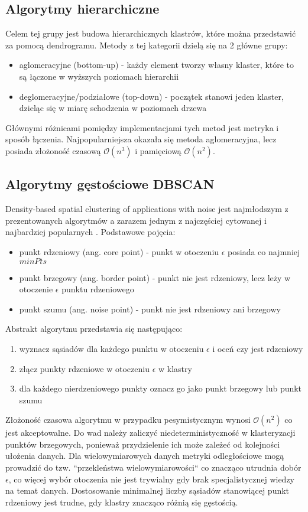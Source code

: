 \subsection{Algorytmy hierarchiczne}
Celem tej grupy jest budowa hierarchicznych klastrów, które można przedstawić za pomocą dendrogramu. Metody z tej kategorii dzielą się na 2 główne grupy:
\begin{itemize}
	\item aglomeracyjne (bottom-up) - każdy element tworzy własny klaster, które to są łączone w wyższych poziomach hierarchii
	\item deglomeracyjne/podziałowe (top-down) - początek stanowi jeden klaster, dzieląc się w miarę schodzenia w poziomach drzewa
\end{itemize}
Głównymi różnicami pomiędzy implementacjami tych metod jest metryka i sposób łączenia. Najpopularniejsza okazała się metoda aglomeracyjna, lecz posiada złożoność czasową $\mathcal{O}(n^3)$ i pamięciową $\mathcal{O}(n^2)$.

\subsection{Algorytmy gęstościowe DBSCAN}
Density-based spatial clustering of applications with noise jest najmłodszym z prezentowanych algorytmów a zarazem jednym z najczęściej cytowanej i najbardziej popularnych \cite{Est96}.
Podstawowe pojęcia:
\begin{itemize}
	\item punkt rdzeniowy (ang. core point) - punkt w otoczeniu $\epsilon$ posiada co najmniej $minPts$
	\item punkt brzegowy (ang. border point) - punkt nie jest rdzeniowy, lecz leży w otoczenie $\epsilon$ punktu rdzeniowego
	\item punkt szumu (ang. noise point) - punkt nie jest rdzeniowy ani brzegowy
\end{itemize}
Abstrakt algorytmu przedstawia się następująco: \cite{Sch17}
\begin{enumerate}
	\item wyznacz sąsiadów dla każdego punktu w otoczeniu $\epsilon$ i oceń czy jest rdzeniowy
	\item złącz punkty rdzeniowe w otoczeniu $\epsilon$ w klastry
	\item dla każdego nierdzeniowego punkty oznacz go jako punkt brzegowy lub punkt szumu
\end{enumerate}
Złożoność czasowa algorytmu w przypadku pesymistycznym wynosi $\mathcal{O}(n^2)$ co jest akceptowalne. Do wad należy zaliczyć niedeterministyczność w klasteryzacji punktów brzegowych, ponieważ przydzielenie ich może zależeć od kolejności ułożenia danych. Dla wielowymiarowych danych metryki odległościowe mogą prowadzić do tzw. ``przekleństwa wielowymiarowości`` co znacząco utrudnia dobór $\epsilon$, co więcej wybór otoczenia nie jest trywialny gdy brak specjalistycznej wiedzy na temat danych. Dostosowanie minimalnej liczby sąsiadów stanowiącej punkt rdzeniowy jest trudne, gdy klastry znacząco różnią się gęstością.

